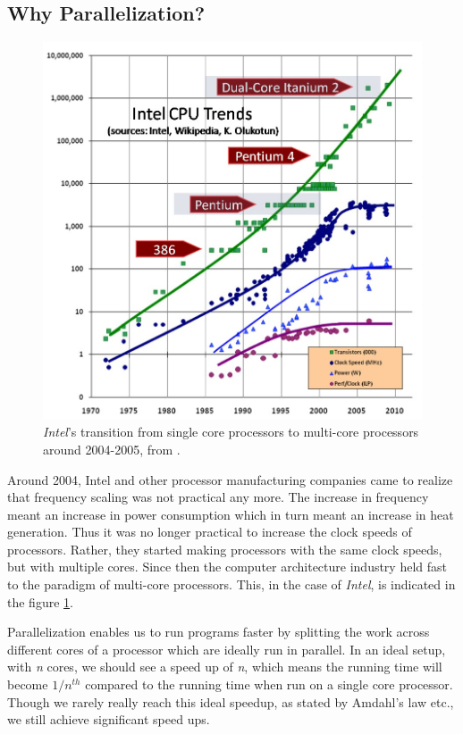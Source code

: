 \documentclass[MTech]{iitmdiss}
\begin{document}
\subsection{Why Parallelization?}
\begin{figure}[h]
    \centering
    \includegraphics[width=\textwidth,scale=0.6,keepaspectratio=true]{CPU-Scaling.jpg}
    \caption{
        \textit{Intel}'s transition from single core processors to multi-core processors around 2004-2005, from \cite{Herb:Intel}.
    }
    \label{fig:intel}
\end{figure}
Around 2004, Intel and other processor manufacturing companies came to realize that frequency scaling was not practical any more. The increase in frequency meant an increase in power consumption which in turn meant an increase in heat generation. Thus it was no longer practical to increase the clock speeds of processors. Rather, they started making processors with the same clock speeds, but with multiple cores. Since then the computer architecture industry held fast to the paradigm of multi-core processors. This, in the case of \textit{Intel}, is indicated in the figure \ref{fig:intel}.

Parallelization enables us to run programs faster by splitting the work across different cores of a processor which are ideally run in parallel. In an ideal setup, with \textit{n} cores, we should see a speed up of \textit{n}, which means the running time will become $1/n^{th}$ compared to the running time when run on a single core processor. Though we rarely really reach this ideal speedup, as stated by Amdahl's law \citep{Amdahl:1967:VSP:1465482.1465560} etc., we still achieve significant speed ups.
\end{document}
